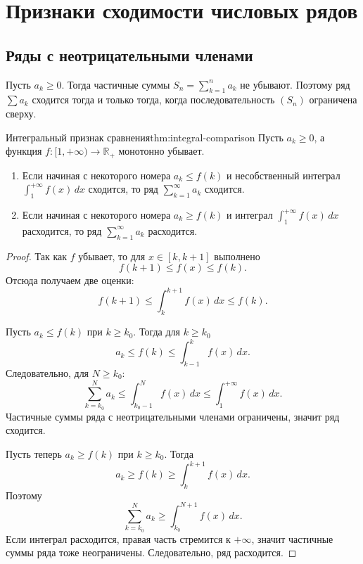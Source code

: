 
\section{Признаки сходимости числовых рядов}

\subsection{Ряды с неотрицательными членами}

Пусть \(a_k\ge 0\). Тогда частичные суммы \(S_n=\sum_{k=1}^{n}a_k\) не убывают. Поэтому ряд \(\sum a_k\) сходится тогда и только тогда, когда последовательность \((S_n)\) ограничена сверху.

\begin{Theorem}{Интегральный признак сравнения}{thm:integral-comparison}
	Пусть \(a_k\ge 0\), а функция \(f:[1,+\infty)\to\mathbb R_+\) монотонно убывает.
	
	\begin{enumerate}
		\item Если начиная с некоторого номера \(a_k\le f(k)\) и несобственный интеграл \(\int_1^{+\infty} f(x)\,dx\) сходится, то ряд \(\sum_{k=1}^{\infty} a_k\) сходится.
		
		\item Если начиная с некоторого номера \(a_k\ge f(k)\) и интеграл \(\int_1^{+\infty} f(x)\,dx\) расходится, то ряд \(\sum_{k=1}^{\infty} a_k\) расходится.
	\end{enumerate}
\end{Theorem}

\begin{proof}
Так как \(f\) убывает, то для \(x\in[k,k+1]\) выполнено
\[
f(k+1)\le f(x)\le f(k).
\]
Отсюда получаем две оценки:
\[
f(k+1)\le \int_k^{k+1} f(x)\,dx\le f(k).
\]

Пусть \(a_k\le f(k)\) при \(k\ge k_0\). Тогда для \(k\ge k_0\)
\[
a_k\le f(k)\le \int_{k-1}^{k} f(x)\,dx.
\]
Следовательно, для \(N\ge k_0\):
\[
\sum_{k=k_0}^{N} a_k
\le
\int_{k_0-1}^{N} f(x)\,dx
\le
\int_1^{+\infty} f(x)\,dx.
\]
Частичные суммы ряда с неотрицательными членами ограничены, значит ряд сходится.

Пусть теперь \(a_k\ge f(k)\) при \(k\ge k_0\). Тогда
\[
a_k\ge f(k)\ge \int_k^{k+1}f(x)\,dx.
\]
Поэтому
\[
\sum_{k=k_0}^{N}a_k
\ge
\int_{k_0}^{N+1}f(x)\,dx.
\]
Если интеграл расходится, правая часть стремится к \(+\infty\), значит частичные суммы ряда тоже неограничены. Следовательно, ряд расходится. 
\end{proof}

